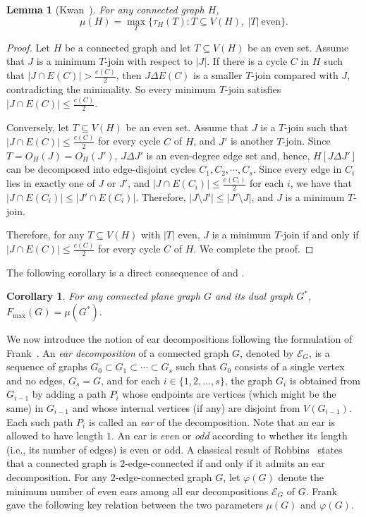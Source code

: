 \documentclass[a4paper,12pt]{article}
\theoremstyle{plain}
\newtheorem{lemma}[lemma]{Lemma}
\newtheorem{corollary}[corollary]{Corollary}
\theoremstyle{definition}
\theoremstyle{remark}
\numberwithin{equation}{section}
\newcommand{\abs}[1]{\lvert#1\rvert}
\begin{document}
\begin{lemma}[Kwan~\rm \cite{K1962}]\label{lem:join-fmax}
For any connected graph $H$, 
$$\mu(H)=\max\limits_T\{\tau_H(T): T\subseteq V(H), ~|T|~\text{even} \}.$$
\end{lemma}
\begin{proof}
Let $H$ be a connected graph and let $T\subseteq V(H)$ be an even set. Assume that $J$ is a minimum $T$-join with respect to $|J|$. If there is a cycle $C$ in $H$ such that $\abs{J\cap E(C)}>\frac{e(C)}2$, then $J\Delta E(C)$ is a smaller $T$-join compared with $J$, contradicting the minimality. So every minimum $T$-join satisfies $\abs{J\cap E(C)}\le\frac{e(C)}2$. 
    
Conversely, let $T\subseteq V(H)$ be an even set. Assume that $J$ is a $T$-join such that $\abs{J\cap E(C)}\le\frac{e(C)}2$ for every cycle $C$ of $H$, and $J'$ is another $T$-join. Since $T=O_H(J)=O_H(J')$,  $J\Delta J'$ is an even-degree edge set and, hence, $H[J\Delta J']$ can be decomposed into edge-disjoint cycles $C_1,C_2,\cdots, C_s$. Since every edge in $C_i$ lies in exactly one of $J$ or $J'$, and $\abs{J\cap E(C_i)}\le\frac{e(C_i)}2$ for each $i$, we have that $\abs{J\cap E(C_i)}\leq \abs{J'\cap E(C_i)}$. Therefore, $\abs{J\setminus J'}\le \abs{J'\setminus J}$, and $J$ is a minimum $T$-join. 


Therefore, for any $T\subseteq V(H)$ with $|T|$ even, $J$ is a minimum $T$-join if and only if $\abs{J\cap E(C)}\le\frac{e(C)}2$ for every cycle $C$ of $H$. We complete the proof. 
\end{proof}

The following corollary is a direct consequence of  and .

\begin{corollary}\label{col:fmaxeq}
For any connected plane graph $G$ and its dual graph $G^*$, $F_{\max}(G)=\mu(G^*).$
\end{corollary}

We now introduce the notion of ear decompositions following the formulation of Frank~\cite{F1993}. An \emph{ear decomposition} of a connected graph $G$, denoted by $\mathcal{E}_G$, is a sequence of graphs $G_0\subset G_1\subset \cdots \subset G_s$ such that $G_0$ consists of a single vertex and no edges, $G_s=G$, and for each $i\in\{1,2,\ldots,s\}$, the graph $G_i$ is obtained from $G_{i-1}$ by adding a path $P_i$ whose endpoints are vertices (which might be the same) in $G_{i-1}$ and whose internal vertices (if any) are disjoint from $V(G_{i-1})$. Each such path $P_i$ is called an \emph{ear} of the decomposition. Note that an ear is allowed to have length $1$. An ear is \emph{even} or \emph{odd} according to whether its length (i.e., its number of edges) is even or odd. A classical result of Robbins~\cite{R1939} states that a connected graph is $2$-edge-connected if and only if it admits an ear decomposition. For any $2$-edge-connected graph $G$, let $\varphi(G)$ denote the minimum number of even ears among all ear decompositions $\mathcal{E}_G$ of $G$. Frank~\cite{F1993} gave the following key relation between the two parameters $\mu(G)$ and $\varphi(G)$.
\end{document}
